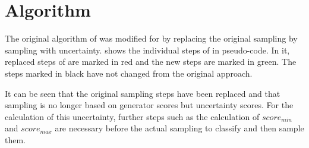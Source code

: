\section{Algorithm}
\label{sec:algorithm}
%
The original algorithm of \kbgan was modified for \usgan by replacing the original sampling by sampling with uncertainty.
 shows the individual steps of \kbgan in pseudo-code.
In it, replaced steps of \kbgan are marked in red and the new steps are marked in green.
The steps marked in black have not changed from the original approach.

It can be seen that the original sampling steps have been replaced and that sampling is no longer based on generator scores but uncertainty scores.
For the calculation of this uncertainty, further steps such as the calculation of $score_{min}$ and $score_{max}$ are necessary before the actual sampling to classify and then sample them.
